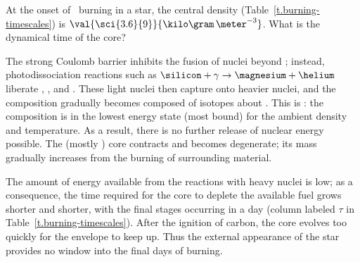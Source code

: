 \begin{exercisebox}
At the onset of \oxygen\ burning in a  star, the central density (Table~\ref{t.burning-timescales}) is $\val{\sci{3.6}{9}}{\kilo\gram\,\meter^{-3}}$.  What is the dynamical time of the core?
\end{exercisebox}

The strong Coulomb barrier inhibits the fusion of nuclei beyond \oxygen; instead, photodissociation reactions such as $\silicon+\gamma \to \magnesium+\helium$ liberate \nt, \pt, and \helium.  These light nuclei then capture onto heavier nuclei, and the composition gradually becomes composed of isotopes about \iron.  This is : the composition is in the lowest energy state (most bound) for the ambient density and temperature. As a result, there is no further release of nuclear energy possible. The (mostly \iron) core contracts and becomes degenerate; its mass gradually increases from the burning of surrounding material.

The amount of energy available from the reactions with heavy nuclei is low; as a consequence, the time required for the core to deplete the available fuel grows shorter and shorter, with the final stages occurring in a day (column labeled $\tau$ in Table~\ref{t.burning-timescales}). After the ignition of carbon, the core evolves too quickly for the envelope to keep up. Thus the external appearance of the star provides no window into the final days of burning.

